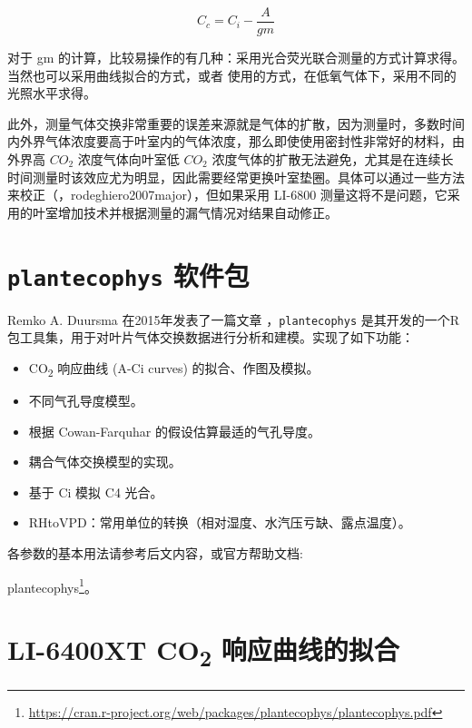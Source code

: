 \documentclass[
]{krantz}
\providecommand{\tightlist}{%
  \setlength{\itemsep}{0pt}\setlength{\parskip}{0pt}}
\renewcommand{\href}[2]{#2\footnote{\url{#1}}}
\begin{document}
\begin{equation}
C_c = C_i - \frac{A}{gm}
\label{eq:notecc}
\end{equation}

对于 gm 的计算，比较易操作的有几种：采用光合荧光联合测量的方式计算求得。当然也可以采用曲线拟合的方式，或者 \citet{yin2009using} 使用的方式，在低氧气体下，采用不同的光照水平求得。

此外，测量气体交换非常重要的误差来源就是气体的扩散，因为测量时，多数时间内外界气体浓度要高于叶室内的气体浓度，那么即使使用密封性非常好的材料，由外界高 \(CO_2\) 浓度气体向叶室低 \(CO_2\) 浓度气体的扩散无法避免，尤其是在连续长时间测量时该效应尤为明显，因此需要经常更换叶室垫圈。具体可以通过一些方法来校正（\citet{Flexas2007leak}，rodeghiero2007major），但如果采用 LI-6800 测量这将不是问题，它采用的叶室增加技术并根据测量的漏气情况对结果自动修正。

\cleardoublepage

\hypertarget{plantecophys}{%
\section{\texorpdfstring{\texttt{plantecophys} 软件包}{plantecophys 软件包}}\label{plantecophys}}

Remko A. Duursma 在2015年发表了一篇文章 \citet{Duursma2015Plantecophys}，\texttt{plantecophys} 是其开发的一个R包工具集，用于对叶片气体交换数据进行分析和建模。实现了如下功能：

\begin{itemize}
\tightlist
\item
  CO\textsubscript{2} 响应曲线 (A-Ci curves) 的拟合、作图及模拟。
\item
  不同气孔导度模型。
\item
  根据 Cowan-Farquhar 的假设估算最适的气孔导度。
\item
  耦合气体交换模型的实现。
\item
  基于 Ci 模拟 C4 光合。
\item
  RHtoVPD：常用单位的转换（相对湿度、水汽压亏缺、露点温度）。
\end{itemize}

各参数的基本用法请参考后文内容，或官方帮助文档:

\href{https://cran.r-project.org/web/packages/plantecophys/plantecophys.pdf}{plantecophys}。

\hypertarget{fit6400}{%
\section{\texorpdfstring{LI-6400XT CO\textsubscript{2} 响应曲线的拟合}{LI-6400XT CO2 响应曲线的拟合}}\label{fit6400}}
\end{document}
